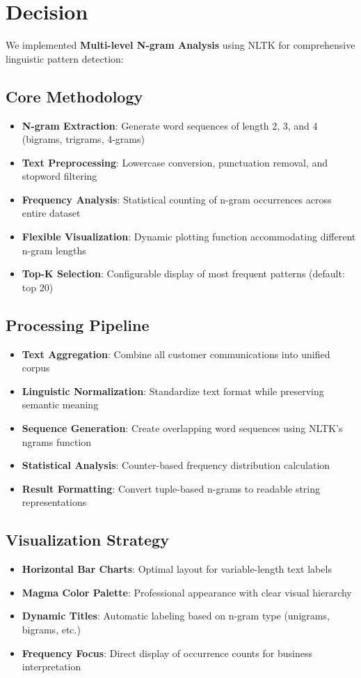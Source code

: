 \documentclass[11pt]{article}
\begin{document}
\section{Decision}

We implemented \textbf{Multi-level N-gram Analysis} using NLTK for comprehensive linguistic pattern detection:

\subsection{Core Methodology}
\begin{itemize}
\item \textbf{N-gram Extraction}: Generate word sequences of length 2, 3, and 4 (bigrams, trigrams, 4-grams)
\item \textbf{Text Preprocessing}: Lowercase conversion, punctuation removal, and stopword filtering
\item \textbf{Frequency Analysis}: Statistical counting of n-gram occurrences across entire dataset
\item \textbf{Flexible Visualization}: Dynamic plotting function accommodating different n-gram lengths
\item \textbf{Top-K Selection}: Configurable display of most frequent patterns (default: top 20)
\end{itemize}

\subsection{Processing Pipeline}
\begin{itemize}
\item \textbf{Text Aggregation}: Combine all customer communications into unified corpus
\item \textbf{Linguistic Normalization}: Standardize text format while preserving semantic meaning
\item \textbf{Sequence Generation}: Create overlapping word sequences using NLTK's ngrams function
\item \textbf{Statistical Analysis}: Counter-based frequency distribution calculation
\item \textbf{Result Formatting}: Convert tuple-based n-grams to readable string representations
\end{itemize}

\subsection{Visualization Strategy}
\begin{itemize}
\item \textbf{Horizontal Bar Charts}: Optimal layout for variable-length text labels
\item \textbf{Magma Color Palette}: Professional appearance with clear visual hierarchy
\item \textbf{Dynamic Titles}: Automatic labeling based on n-gram type (unigrams, bigrams, etc.)
\item \textbf{Frequency Focus}: Direct display of occurrence counts for business interpretation
\end{itemize}
\end{document}
